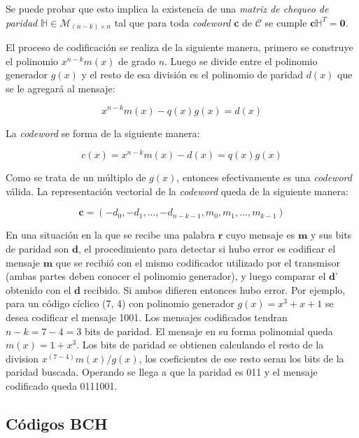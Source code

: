 Se puede probar que esto implica la existencia de una \textit{matriz de chequeo de paridad} $\mathbb{H} \in \mathcal{M}_{(n-k)\times n}$ tal que para toda \textit{codeword} \textbf{c} de $\mathcal{C}$ se cumple $\textbf{c} \mathbb{H} ^T = \textbf{0}$.


El proceso de codificación se realiza de la siguiente manera, primero se construye el polinomio $x^{n-k}m(x)$ de grado $n$. Luego se divide entre el polinomio generador $g(x)$ y el resto de esa división es el polinomio de paridad $d(x)$ que se le agregará al mensaje:

\begin{equation}
x^{n-k}m(x) - q(x)g(x) = d(x)
\end{equation}

La \textit{codeword} se forma de la siguiente manera:

\begin{equation}
c(x) = x^{n-k}m(x)-d(x) = q(x)g(x)
\end{equation}

Como se trata de un múltiplo de $g(x)$, entonces efectivamente es una \textit{codeword} válida. La representación vectorial de la \textit{codeword} queda de la siguiente manera:

\begin{equation}
\textbf{c} = (-d_0, -d_1, ..., -d_{n-k-1}, m_0, m_1, ..., m_{k-1})
\end{equation}

En una situación en la que se recibe una palabra $\textbf{r}$ cuyo mensaje es $\textbf{m}$  y sus bits de paridad son $\textbf{d}$, el procedimiento para detectar si hubo error es codificar el mensaje $\textbf{m}$ que se recibió con el mismo codificador utilizado por el transmisor (ambas partes deben conocer el polinomio generador), y luego comparar el $\textbf{d'}$ obtenido con el $\textbf{d}$ recibido. Si ambos difieren entonces hubo error. 
Por ejemplo, para un código cíclico (7, 4) con polinomio generador $g(x) = x^3 + x + 1$ se desea codificar el mensaje 1001. Los mensajes codificados tendran $n-k = 7 - 4 = 3$ bits de paridad. El mensaje en su forma polinomial queda $m(x) = 1 + x^3$.
Los bits de paridad se obtienen calculando el resto de la division $x^{(7-4)}m(x)/g(x)$, los coeficientes de ese resto seran los bits de la paridad buscada. Operando se llega a que la paridad es 011 y el mensaje codificado queda 0111001.

	
	
	\subsection{C\'odigos BCH}
